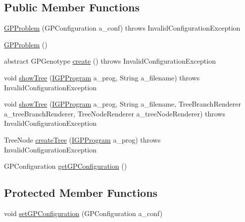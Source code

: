 \subsection*{Public Member Functions}
\begin{DoxyCompactItemize}
\item 
\hyperlink{classorg_1_1jgap_1_1gp_1_1_g_p_problem_abeb5ab6abffaa068b9bd506c0908e06a}{G\-P\-Problem} (G\-P\-Configuration a\-\_\-conf)  throws Invalid\-Configuration\-Exception 
\item 
\hyperlink{classorg_1_1jgap_1_1gp_1_1_g_p_problem_a746c560c416662e7faebf10bf522c1ba}{G\-P\-Problem} ()
\item 
abstract G\-P\-Genotype \hyperlink{classorg_1_1jgap_1_1gp_1_1_g_p_problem_a9c453825ecc8d4f20a6cc17c6c5d78cb}{create} ()  throws Invalid\-Configuration\-Exception
\item 
void \hyperlink{classorg_1_1jgap_1_1gp_1_1_g_p_problem_aec7c228e86c1f67331e95b1ab7bfb852}{show\-Tree} (\hyperlink{interfaceorg_1_1jgap_1_1gp_1_1_i_g_p_program}{I\-G\-P\-Program} a\-\_\-prog, String a\-\_\-filename)  throws Invalid\-Configuration\-Exception 
\item 
void \hyperlink{classorg_1_1jgap_1_1gp_1_1_g_p_problem_a27d318e39fde759fbf39599da214baef}{show\-Tree} (\hyperlink{interfaceorg_1_1jgap_1_1gp_1_1_i_g_p_program}{I\-G\-P\-Program} a\-\_\-prog, String a\-\_\-filename, Tree\-Branch\-Renderer a\-\_\-tree\-Branch\-Renderer, Tree\-Node\-Renderer a\-\_\-tree\-Node\-Renderer)  throws Invalid\-Configuration\-Exception 
\item 
Tree\-Node \hyperlink{classorg_1_1jgap_1_1gp_1_1_g_p_problem_af091b9b1746a7d056c062dbb7406176a}{create\-Tree} (\hyperlink{interfaceorg_1_1jgap_1_1gp_1_1_i_g_p_program}{I\-G\-P\-Program} a\-\_\-prog)  throws Invalid\-Configuration\-Exception 
\item 
G\-P\-Configuration \hyperlink{classorg_1_1jgap_1_1gp_1_1_g_p_problem_ab8fe980a790816ca78e05f3f01392b79}{get\-G\-P\-Configuration} ()
\end{DoxyCompactItemize}
\subsection*{Protected Member Functions}
\begin{DoxyCompactItemize}
\item 
void \hyperlink{classorg_1_1jgap_1_1gp_1_1_g_p_problem_ade62af80c6156199cac52f8aa7c9b444}{set\-G\-P\-Configuration} (G\-P\-Configuration a\-\_\-conf)
\end{DoxyCompactItemize}
